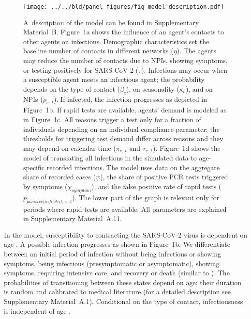 \documentclass[fleqn,10pt]{wlscirep}
\begin{document}
\begin{figure}[tb]
    \centering
    \texttt{[image: ../../bld/panel\_figures/fig-model-description.pdf]}
    \caption{
        A~description of the model can be found in Supplementary Material~B. Figure~1a
        shows the influence of an agent's contacts to other agents on infections.
        Demographic characteristics set the baseline number of contacts in different
        networks ($\eta$). The agents may reduce the number of contacts due to NPIs,
        showing symptoms, or testing positively for SARS-CoV-2 ($\tau$). Infections may
        occur when a susceptible agent meets an infectious agent; the probability
        depends on the type of contact ($\beta_c$), on seasonality ($\kappa_c$), and on
        NPIs ($\rho_{c,\:t}$). If infected, the infection progresses as depicted in
        Figure~1b. If rapid tests are available, agents' demand is modeled as in
        Figure~1c. All reasons trigger a test only for a fraction of individuals
        depending on an individual compliance parameter; the thresholds for triggering
        test demand differ across reasons and they may depend on calendar time
        ($\pi_{c,\:t}$ and $\tau_{c,\:t}$). Figure~1d shows the model of translating all
        infections in the simulated data to age-specific recorded infections. The model
        uses data on the aggregate share of recorded cases ($\psi$), the share of
        positive PCR tests triggered by symptoms ($\chi_{symptom}$), and the false
        positive rate of rapid tests ($p_{positive|infected,\;i,\:t}$). The lower part
        of the graph is relevant only for periods where rapid tests are available. All
        parameters are explained in Supplementary Material~A.11.
    }
    \label{fig:model_description}
\end{figure}

In the model, susceptibility to contracting the SARS-CoV-2 virus is dependent on age
\cite{Davies2020,Goldstein2021}. A possible infection progresses as shown in Figure~1b.
We differentiate between an initial period of infection without being infectious or
showing symptoms, being infectious (presymptomatic or asymptomatic), showing symptoms,
requiring intensive care, and recovery or death (similar to \cite{Aleta2020}). The
probabilities of transitioning between these states depend on age; their duration is
random and calibrated to medical literature (for a detailed description see
Supplementary Material~A.1). Conditional on the type of contact, infectiousness is
independent of age \cite{Jones2021}.
\end{document}
